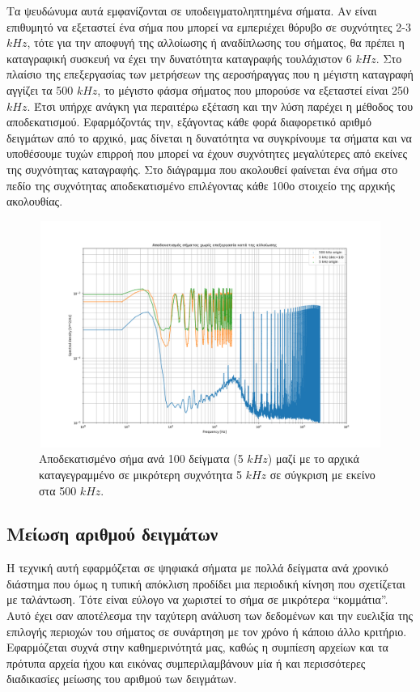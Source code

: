 \documentclass[breaklines=true, 12pt]{article}
\begin{document}
Τα ψευδώνυμα αυτά εμφανίζονται σε υποδειγματοληπτημένα σήματα. Αν είναι επιθυμητό
να εξεταστεί ένα σήμα που μπορεί να εμπεριέχει θόρυβο σε συχνότητες 2-3 \(kHz\), τότε για
την αποφυγή της αλλοίωσης ή αναδίπλωσης του σήματος, θα πρέπει η καταγραφική συσκευή
να έχει την δυνατότητα καταγραφής τουλάχιστον 6 \(kHz\). Στο πλαίσιο της επεξεργασίας των
μετρήσεων της αεροσήραγγας που η μέγιστη καταγραφή αγγίζει τα 500 \(kHz\), το μέγιστο
φάσμα σήματος που μπορούσε να εξεταστεί είναι 250 \(kHz\). Έτσι υπήρχε ανάγκη για
περαιτέρω εξέταση και την λύση παρέχει η μέθοδος του αποδεκατισμού. Εφαρμόζοντάς την,
εξάγοντας κάθε φορά διαφορετικό αριθμό δειγμάτων από το αρχικό, μας δίνεται η
δυνατότητα να συγκρίνουμε τα σήματα και να υποθέσουμε τυχών επιρροή που μπορεί να
έχουν συχνότητες μεγαλύτερες από εκείνες της συχνότητας καταγραφής. Στο διάγραμμα
που ακολουθεί φαίνεται ένα σήμα στο πεδίο της συχνότητας αποδεκατισμένο επιλέγοντας
κάθε 100ο στοιχείο της αρχικής ακολουθίας.

\begin{figure}[htbp]
\centering
\includegraphics[width=500px,height=280px]{./decimation/with_aliasing.png}
\caption{Αποδεκατισμένο σήμα ανά 100 δείγματα (5 \(kHz\)) μαζί με το αρχικά καταγεγραμμένο σε μικρότερη συχνότητα 5 \(kHz\) σε σύγκριση με εκείνο στα 500 \(kHz\).}
\end{figure}
\subsection{Μείωση αριθμού δειγμάτων}
\label{sec:orge1fbc86}
Η τεχνική αυτή εφαρμόζεται σε ψηφιακά σήματα με πολλά δείγματα ανά
χρονικό διάστημα που όμως η τυπική απόκλιση προδίδει μια περιοδική
κίνηση που σχετίζεται με ταλάντωση. Τότε είναι εύλογο να χωριστεί το
σήμα σε μικρότερα “κομμάτια”. Αυτό έχει σαν αποτέλεσμα την ταχύτερη
ανάλυση των δεδομένων και την ευελιξία της επιλογής περιοχών του σήματος σε
συνάρτηση με τον χρόνο ή κάποιο άλλο κριτήριο. Εφαρμόζεται συχνά στην
καθημερινότητά μας, καθώς η συμπίεση αρχείων και τα πρότυπα αρχεία ήχου
και εικόνας συμπεριλαμβάνουν μία ή και περισσότερες διαδικασίες μείωσης
του αριθμού των δειγμάτων.
\end{document}
